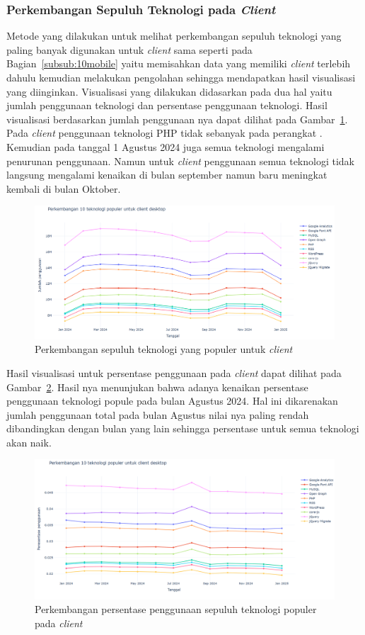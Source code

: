 \subsubsection{Perkembangan Sepuluh Teknologi pada \textit{Client} \desktop}

Metode yang dilakukan untuk melihat perkembangan sepuluh teknologi yang paling banyak digunakan untuk \textit{client} \desktop sama seperti pada Bagian~\ref{subsub:10mobile} yaitu memisahkan data yang memiliki \textit{client} \desktop terlebih dahulu kemudian melakukan pengolahan sehingga mendapatkan hasil visualisasi yang diinginkan. Visualisasi yang dilakukan didasarkan pada dua hal yaitu jumlah penggunaan teknologi dan persentase penggunaan teknologi. Hasil visualisasi berdasarkan jumlah penggunaan nya dapat dilihat pada Gambar~\ref{fig:10dekstop}. Pada \textit{client} \desktop penggunaan teknologi PHP tidak sebanyak pada perangkat \mobile. Kemudian pada tanggal 1 Agustus 2024 juga semua teknologi mengalami penurunan penggunaan. Namun untuk \textit{client} \desktop penggunaan semua teknologi tidak langsung mengalami kenaikan di bulan september namun baru meningkat kembali di bulan Oktober.
\begin{figure}[H]
    \centering
    \includegraphics[width=0.7\linewidth]{Gambar/Perkembangan 10 teknologi pada desktop.png}
    \caption{Perkembangan sepuluh teknologi yang populer untuk \textit{client} \desktop}
    \label{fig:10dekstop}
\end{figure}

Hasil visualisasi untuk persentase penggunaan pada \textit{client} \desktop dapat dilihat pada Gambar~\ref{fig:persentasedesktop}. Hasil nya menunjukan bahwa adanya kenaikan persentase penggunaan teknologi popule pada bulan Agustus 2024. Hal ini dikarenakan jumlah penggunaan total pada bulan Agustus nilai nya paling rendah dibandingkan dengan bulan yang lain sehingga persentase untuk semua teknologi akan naik.
\begin{figure}[H]
    \centering
    \includegraphics[width=0.7\linewidth]{Gambar/Perkembangan persentase pada desktop.png}
    \caption{Perkembangan persentase penggunaan sepuluh teknologi populer pada \textit{client} \desktop}
    \label{fig:persentasedesktop}
\end{figure}

